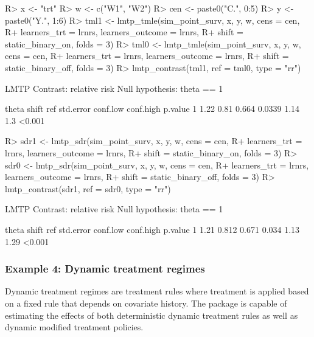 \documentclass[]{jss}
\begin{document}
\begin{CodeChunk}

\begin{CodeInput}
R> x <- "trt"
R> w <- c("W1", "W2")
R> cen <- paste0("C.", 0:5)
R> y <- paste0("Y.", 1:6)
R> tml1 <- lmtp_tmle(sim_point_surv, x, y, w, cens = cen, 
R+                   learners_trt = lrnrs, learners_outcome = lrnrs,
R+                   shift = static_binary_on, folds = 3)
R> tml0 <- lmtp_tmle(sim_point_surv, x, y, w, cens = cen, 
R+                   learners_trt = lrnrs, learners_outcome = lrnrs,
R+                   shift = static_binary_off, folds = 3)
R> lmtp_contrast(tml1, ref = tml0, type = "rr")
\end{CodeInput}

\begin{CodeOutput}
  LMTP Contrast: relative risk
Null hypothesis: theta == 1

  theta shift   ref std.error conf.low conf.high p.value
1  1.22  0.81 0.664    0.0339     1.14       1.3  <0.001
\end{CodeOutput}

\begin{CodeInput}
R> sdr1 <- lmtp_sdr(sim_point_surv, x, y, w, cens = cen, 
R+                 learners_trt = lrnrs, learners_outcome = lrnrs,
R+                 shift = static_binary_on, folds = 3)
R> sdr0 <- lmtp_sdr(sim_point_surv, x, y, w, cens = cen, 
R+                 learners_trt = lrnrs, learners_outcome = lrnrs,
R+                 shift = static_binary_off, folds = 3)
R> lmtp_contrast(sdr1, ref = sdr0, type = "rr")
\end{CodeInput}

\begin{CodeOutput}
  LMTP Contrast: relative risk
Null hypothesis: theta == 1

  theta shift   ref std.error conf.low conf.high p.value
1  1.21 0.812 0.671     0.034     1.13      1.29  <0.001
\end{CodeOutput}

\end{CodeChunk}

\hypertarget{example-4-dynamic-treatment-regimes}{%
\subsubsection{Example 4: Dynamic treatment regimes}\label{example-4-dynamic-treatment-regimes}}

Dynamic treatment regimes are treatment rules where treatment is applied based on a fixed rule that depends on covariate history. The  package is capable of estimating the effects of both deterministic dynamic treatment rules as well as dynamic modified treatment policies. 
\end{document}
